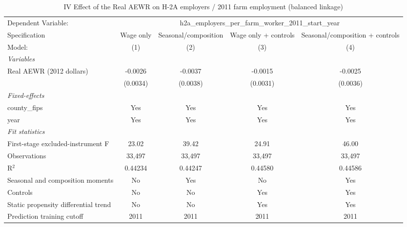 
\begin{table}[htbp]
   \caption{\label{tab:iv_h2a_employers} IV Effect of the Real AEWR on H-2A employers / 2011 farm employment (balanced linkage)}
   \centering
   \begin{tabular}{lcccc}
      \tabularnewline \midrule \midrule
      Dependent Variable: & \multicolumn{4}{c}{h2a\_employers\_per\_farm\_worker\_2011\_start\_year}\\
      Specification                        & Wage only & Seasonal/composition & Wage only + controls & Seasonal/composition + controls \\
      Model:                               & (1)       & (2)                  & (3)                  & (4)\\
      \midrule
      \emph{Variables}\\
      Real AEWR (2012 dollars)             & -0.0026   & -0.0037              & -0.0015              & -0.0025\\
                                           & (0.0034)  & (0.0038)             & (0.0031)             & (0.0036)\\
      \midrule
      \emph{Fixed-effects}\\
      county\_fips                         & Yes       & Yes                  & Yes                  & Yes\\
      year                                 & Yes       & Yes                  & Yes                  & Yes\\
      \midrule
      \emph{Fit statistics}\\
      First-stage excluded-instrument F    & 23.02     & 39.42                & 24.91                & 46.00\\
      Observations                         & 33,497    & 33,497               & 33,497               & 33,497\\
      R$^2$                                & 0.44234   & 0.44247              & 0.44580              & 0.44586\\
      Seasonal and composition moments     & No        & Yes                  & No                   & Yes\\
      Controls                             & No        & No                   & Yes                  & Yes\\
      Static propensity differential trend & No        & No                   & Yes                  & Yes\\
      Prediction training cutoff           & 2011      & 2011                 & 2011                 & 2011\\

\end{tabular}
\end{table}
